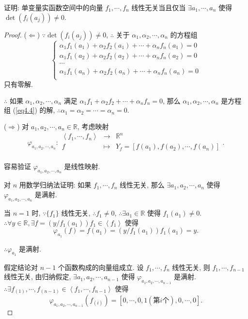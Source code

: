 \documentclass[color=black,device=normal,lang=cn,mode=geye]{elegantnote}
\begin{document}
\begin{exercisec}[1.2.5]
    证明: 单变量实函数空间中的向量 $f_1,\cdots,f_n$ 线性无关当且仅当 $\exists a_1,\cdots,a_n$ 使得 $\det(f_i(a_j))\neq0$.
\end{exercisec}
\begin{proof}  
    ($\Leftarrow$) $\because\det(f_i(a_j))\neq0$, $\therefore$ 关于 $\alpha_1,\alpha_2,\cdots,\alpha_n$ 的方程组
    \begin{equation}\label{eq4.4}
        \begin{cases}
            \alpha_1f_1(a_1)+\alpha_2f_2(a_1)+\cdots+\alpha_nf_n(a_1)=0 \\
            \alpha_1f_1(a_2)+\alpha_2f_2(a_2)+\cdots+\alpha_nf_n(a_2)=0 \\
            \cdots \\
            \alpha_1f_1(a_n)+\alpha_2f_2(a_n)+\cdots+\alpha_nf_n(a_n)=0 \\
        \end{cases}
    \end{equation}
    只有零解.

    $\therefore$ 如果 $\alpha_1,\alpha_2,\cdots,\alpha_n$ 满足 $\alpha_1f_1+\alpha_2f_2+\cdots+\alpha_nf_n=0$, 那么 $\alpha_1,\alpha_2,\cdots,\alpha_n$ 是方程组 (\ref{eq4.4}) 的解, $\therefore\alpha_1=\alpha_2=\cdots=\alpha_n=0$.

    ($\Rightarrow$) 对 $a_1,a_2,\cdots,a_n\in\mathbb{R}$, 考虑映射
    \[\varphi_{a_1,a_2,\cdots,a_n}:\begin{array}{rcl}
        \left<f_1,\cdots,f_n\right> & \to & \mathbb{R}^n \\
        f & \mapsto & Y_f=[f(a_1),f(a_2),\cdots,f(a_n)] \\
    \end{array}.\]

    容易验证 $\varphi_{a_1,a_2,\cdots,a_n}$ 是线性映射.

    对 $n$ 用数学归纳法证明: 如果 $f_1,\cdots,f_n$ 线性无关, 那么 $\exists a_1,a_2,\cdots,a_n$ 使得 $\varphi_{a_1,a_2,\cdots,a_n}$ 是满射.
    
    当 $n=1$ 时, $\because\{f_1\}$ 线性无关, $\therefore f_1\neq0$, $\therefore\exists a_1\in\mathbb{R}$ 使得 $f_1(a_1)\neq0$. $\therefore\forall y\in\mathbb{R},\exists f=(y/f_1(a_1))f_1\in\left<f_1\right>$ 使得
    \[\varphi_{a_1}(f)=f(a_1)=(y/f_1(a_1))f_1(a_1)=y.\]

    $\therefore\varphi_{a_1}$ 是满射.
    
    假定结论对 $n-1$ 个函数构成的向量组成立. 设 $f_1,\cdots,f_n$ 线性无关, 则 $f_1,\cdots,f_{n-1}$ 线性无关, 由归纳假定, $\exists a_1,a_2,\cdots,a_{n-1}$ 使得 $\varphi_{a_1,a_2,\cdots,a_{n-1}}$ 是满射. $\therefore\exists f_{(1)},\cdots,f_{(n-1)}\in\left<f_1,\cdots,f_{n-1}\right>$ 使得
    \[\varphi_{a_1,a_2,\cdots,a_{n-1}}(f_{(i)})=[0,\cdots,0,1(\text{第}i\text{个}),0,\cdots,0].\]


\end{proof}
\end{document}
